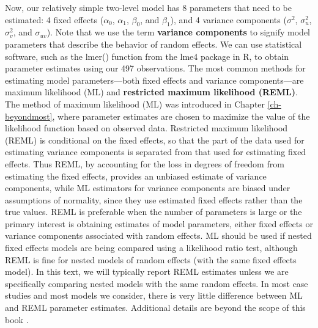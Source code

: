 \documentclass[
]{krantz}
\begin{document}
Now, our relatively simple two-level model has 8 parameters that need to be estimated: 4 fixed effects (\(\alpha_{0}\), \(\alpha_{1}\), \(\beta_{0}\), and \(\beta_{1}\)), and 4 variance components (\(\sigma^{2}\), \(\sigma_{u}^{2}\), \(\sigma_{v}^{2}\), and \(\sigma_{uv}\)). Note that we use the term \textbf{variance components}  to signify model parameters that describe the behavior of random effects. We can use statistical software, such as the lmer() function from the lme4 package in R, to obtain parameter estimates using our 497 observations. The most common methods for estimating model parameters---both fixed effects and variance components---are maximum likelihood (ML) and \textbf{restricted maximum likelihood (REML)}.  The method of maximum likelihood (ML) was introduced in Chapter \ref{ch-beyondmost}, where parameter estimates are chosen to maximize the value of the likelihood function based on observed data. Restricted maximum likelihood (REML) is conditional on the fixed effects, so that the part of the data used for estimating variance components is separated from that used for estimating fixed effects. Thus REML, by accounting for the loss in degrees of freedom from estimating the fixed effects, provides an unbiased estimate of variance components, while ML estimators for variance components are biased under assumptions of normality, since they use estimated fixed effects rather than the true values. REML is preferable when the number of parameters is large or the primary interest is obtaining estimates of model parameters, either fixed effects or variance components associated with random effects. ML should be used if nested fixed effects models are being compared using a likelihood ratio test, although REML is fine for nested models of random effects (with the same fixed effects model). In this text, we will typically report REML estimates unless we are specifically comparing nested models with the same random effects. In most case studies and most models we consider, there is very little difference between ML and REML parameter estimates. Additional details are beyond the scope of this book \citep{Singer2003}.
\end{document}
